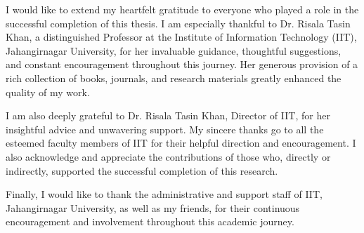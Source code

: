 I would like to extend my heartfelt gratitude to everyone who played a role in the successful completion of this thesis. I am especially thankful to  Dr. Risala Tasin Khan, a distinguished Professor at the Institute of Information Technology (IIT), Jahangirnagar University, for her invaluable guidance, thoughtful suggestions, and constant encouragement throughout this journey. Her generous provision of a rich collection of books, journals, and research materials greatly enhanced the quality of my work.

I am also deeply grateful to Dr. Risala Tasin Khan, Director of IIT, for her insightful advice and unwavering support. My sincere thanks go to all the esteemed faculty members of IIT for their helpful direction and encouragement. I also acknowledge and appreciate the contributions of those who, directly or indirectly, supported the successful completion of this research.

Finally, I would like to thank the administrative and support staff of IIT, Jahangirnagar University, as well as my friends, for their continuous encouragement and involvement throughout this academic journey.

